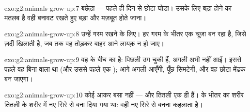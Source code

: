 \begin{solution}{exo:g2:animals-grow-up:7}
बछेड़ा --- पहले ही दिन से छोटा घोड़ा। उसके लिए बड़ा होने का मतलब है
वही बनावट रखते हुए बड़ा और मज़बूत होते जाना।
\end{solution}

\begin{solution}{exo:g2:animals-grow-up:8}
उन्हें गरम रखने के लिए। हर गरम  के भीतर एक चूज़ा बन रहा है, जिसे
ज़र्दी खिलाती है, जब तक वह  तोड़कर बाहर आने लायक़ न हो जाए।
\end{solution}

\begin{solution}{exo:g2:animals-grow-up:9}
वह  के बीच का  है: पिछली  उग चुकी हैं, अगली
 अभी नहीं आईं। इससे पहले वह बिना  वाला  था (और उससे
पहले एक ); आगे अगली  आएँगी, पूँछ सिमटेगी, और वह छोटा मेंढक
बन जाएगा।
\end{solution}

\begin{solution}{exo:g2:animals-grow-up:10}
कोई आकर बसा नहीं ---  और तितली एक ही  हैं।  के भीतर
 का शरीर तितली के शरीर में नए सिरे से बना दिया गया था: वही
नए सिरे से बनना  कहलाता है।
\end{solution}
